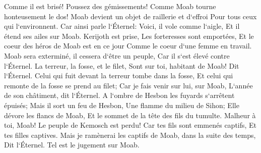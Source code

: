 \verse Comme il est brisé! Poussez des gémissements! Comme Moab tourne honteusement le dos! Moab devient un objet de raillerie et d`effroi Pour tous ceux qui l`environnent. 
\verse Car ainsi parle l`Éternel: Voici, il vole comme l`aigle, Et il étend ses ailes sur Moab. 
\verse Kerijoth est prise, Les forteresses sont emportées, Et le coeur des héros de Moab est en ce jour Comme le coeur d`une femme en travail. 
\verse Moab sera exterminé, il cessera d`être un peuple, Car il s`est élevé contre l`Éternel. 
\verse La terreur, la fosse, et le filet, Sont sur toi, habitant de Moab! Dit l`Éternel. 
\verse Celui qui fuit devant la terreur tombe dans la fosse, Et celui qui remonte de la fosse se prend au filet; Car je fais venir sur lui, sur Moab, L`année de son châtiment, dit l`Éternel. 
\verse A l`ombre de Hesbon les fuyards s`arrêtent épuisés; Mais il sort un feu de Hesbon, Une flamme du milieu de Sihon; Elle dévore les flancs de Moab, Et le sommet de la tête des fils du tumulte. 
\verse Malheur à toi, Moab! Le peuple de Kemosch est perdu! Car tes fils sont emmenés captifs, Et tes filles captives. 
\verse Mais je ramènerai les captifs de Moab, dans la suite des temps, Dit l`Éternel. Tel est le jugement sur Moab. 

